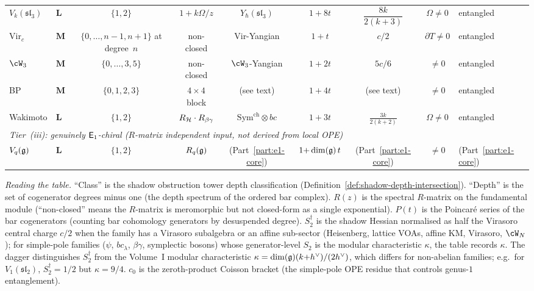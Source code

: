 \begin{computation}
\begin{center}
\begin{tabular}{llccccccl}
$V_k(\mathfrak{sl}_3)$
 & $\mathbf{L}$
 & $\{1,2\}$
 & $1{+}k\Omega/z$
 & $Y_\hbar(\mathfrak{sl}_3)$
 & $1{+}8t$
 & $\dfrac{8k}{2(k{+}3)}$
 & $\Omega\ne 0$
 & entangled \\[5pt]
$\mathrm{Vir}_c$
 & $\mathbf{M}$
 & $\{0,\ldots,n{-}1,n{+}1\}$ at degree~$n$
 & non-closed
 & Vir-Yangian
 & $1{+}t$
 & $c/2$
 & $\partial T\ne 0$
 & entangled \\[3pt]
$\cW_3$
 & $\mathbf{M}$
 & $\{0,\ldots,3,5\}$
 & non-closed
 & $\cW_3$-Yangian
 & $1{+}2t$
 & $5c/6$
 & $\ne 0$
 & entangled \\[3pt]
BP
 & $\mathbf{M}$
 & $\{0,1,2,3\}$
 & $4{\times}4$ block
 & (see text)
 & $1{+}4t$
 & (see text)
 & $\ne 0$
 & entangled \\[3pt]
Wakimoto
 & $\mathbf{L}$
 & $\{1,2\}$
 & $R_{\mathcal{H}} \cdot R_{\beta\gamma}$
 & $\mathrm{Sym}^{\mathrm{ch}} \otimes bc$
 & $1{+}3t$
 & $\frac{3k}{2(k{+}2)}$
 & $\Omega\ne 0$
 & entangled \\[3pt]
\midrule
\multicolumn{9}{l}{\textit{Tier~\textup{(iii)}: genuinely $\mathsf{E}_1$-chiral
 \textup{(}$R$-matrix independent input,
 not derived from local OPE\textup{)}}} \\[2pt]
$V_q(\mathfrak{g})$
 & $\mathbf{L}$
 & $\{1,2\}$
 & $R_q(\mathfrak{g})$
 & (Part~\ref{part:e1-core})
 & $1{+}\dim(\mathfrak{g})\,t$
 & (Part~\ref{part:e1-core})
 & $\ne 0$
 & (Part~\ref{part:e1-core}) \\
\bottomrule
\end{tabular}
\end{center}

\smallskip
\noindent
\emph{Reading the table.}
``Class'' is the shadow obstruction tower depth classification
(Definition~\ref{def:shadow-depth-intersection}).
``Depth'' is the set of cogenerator degrees minus one
(the depth spectrum of the ordered bar complex).
$R(z)$ is the spectral $R$-matrix on the fundamental
module (``non-closed'' means the $R$-matrix is
meromorphic but not closed-form as a single exponential).
$P(t)$ is the Poincar\'{e} series of the bar
cogenerators (counting bar cohomology generators by
desuspended degree).
$S_2^\dagger$ is the shadow Hessian
normalised as half the Virasoro central charge $c/2$
when the family has a Virasoro subalgebra or an
affine sub-sector (Heisenberg, lattice VOAs, affine KM,
Virasoro, $\cW_N$); for simple-pole families
($\psi$, $bc_\lambda$, $\beta\gamma$, symplectic bosons)
whose generator-level $S_2$ is the modular characteristic
$\kappa$, the table records $\kappa$. The dagger
distinguishes $S_2^\dagger$ from the Volume~I modular
characteristic $\kappa = \dim(\mathfrak{g})(k{+}h^\vee)/(2h^\vee)$,
which differs for non-abelian families; e.g.\ for
$V_1(\mathfrak{sl}_2)$, $S_2^\dagger = 1/2$ but
$\kappa = 9/4$.
$c_0$ is the zeroth-product Coisson bracket
(the simple-pole OPE residue that controls genus-$1$
entanglement).


\end{computation}
